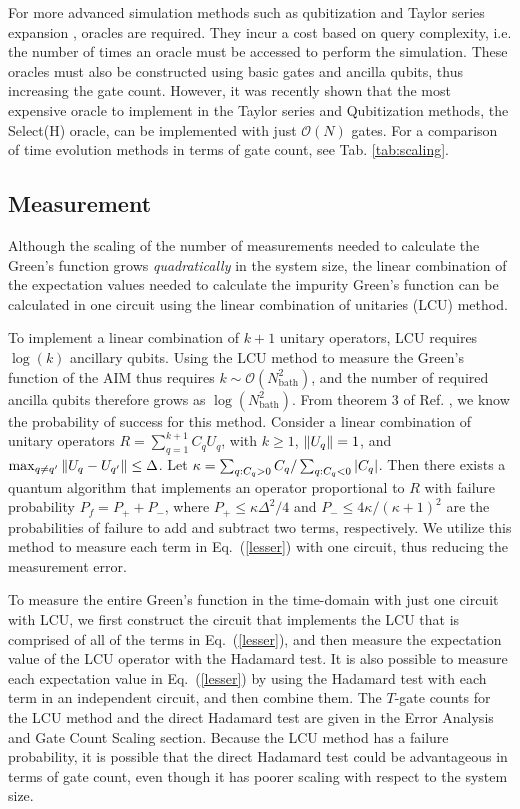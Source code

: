 \documentclass[aip,reprint,table,xcdraw,usenames,dvipsnames]{revtex4-1}
\begin{document}
For more advanced simulation methods such as qubitization\cite{Low2019} and Taylor series expansion \cite{BerryTaylor2015}, oracles are required. They incur a cost based on query complexity, i.e. the number of times an oracle must be accessed to perform the simulation. These oracles must also be constructed using basic gates and ancilla qubits, thus increasing the gate count. However, it was recently shown that the most expensive oracle to implement in the Taylor series and Qubitization methods, the Select(H) oracle, can be implemented with just $\mathcal{O}(N)$  gates\cite{Wan2021}. For a comparison of time evolution methods in terms of gate count, see Tab. \ref{tab:scaling}.

\subsection*{Measurement}
Although the scaling of the number of measurements needed to calculate the Green's function grows \emph{quadratically} in the system size, the linear combination of the expectation values needed to calculate the impurity Green's function can be calculated in one circuit using the linear combination of unitaries (LCU) method\cite{Childs2012}. 

To implement a linear combination of $k+1$ unitary operators, LCU requires $\log(k)$ ancillary qubits. Using the LCU method to measure the Green's function of the AIM thus requires  $k\sim\mathcal{O}(N_{\text{bath}}^2)$, and  the number of required ancilla qubits therefore grows as  $\log(N_{\text{bath}}^2)$. From theorem 3 of Ref. , we know the probability of success for this method. Consider a linear combination of unitary
operators $R = \sum\limits_{q=1}^{k+1} C_q U_q$, with $k\geq1$, $\norm{U_q} = 1$, and $\max_{q \neq q^\prime} 
\norm{U_q - U_{q^\prime}} \leq \Delta$. Let $\kappa = \sum_{q:C_q>0}C_q / \sum_{q:C_q<0} \abs{C_q}$. Then there exists a quantum algorithm that implements an operator proportional to $R$ with failure probability $P_f = P_+ + P_-$, where $P_+ \leq {\kappa \Delta^2}/{4}$ and $P_- \leq {4\kappa}/{(\kappa+1)^2}$ are the probabilities of failure to add and subtract two terms, respectively.
We utilize this method to measure each term in Eq.~(\ref{lesser}) with one circuit, thus reducing the measurement error.

To measure the entire Green's function in the time-domain with just one circuit with LCU, we first construct the circuit that implements the LCU that is comprised of all of the terms in Eq.~(\ref{lesser}), and then measure the expectation value of the LCU operator with the Hadamard test. It is also possible to measure each expectation value in Eq.~(\ref{lesser}) by using the Hadamard test with each term in an independent circuit, and then combine them. The $T$-gate counts for the LCU method and the direct Hadamard test are given in the Error Analysis and Gate Count Scaling section. Because the LCU method has a failure probability, it is possible that the direct Hadamard test could be advantageous in terms of gate count, even though it has poorer scaling with respect to the system size.
\end{document}
